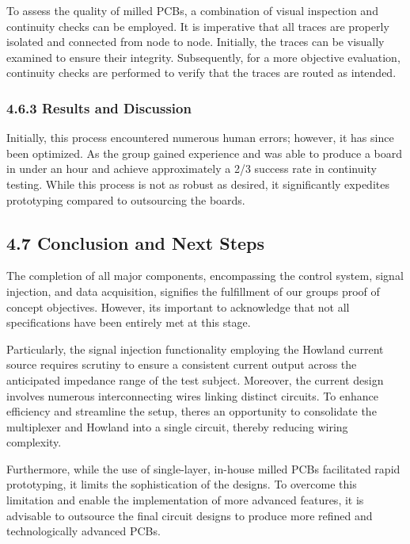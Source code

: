To assess the quality of milled PCBs, a combination of visual inspection
and continuity checks can be employed. It is imperative that all traces
are properly isolated and connected from node to node. Initially, the
traces can be visually examined to ensure their integrity. Subsequently,
for a more objective evaluation, continuity checks are performed to
verify that the traces are routed as intended.

\subsubsection*{\texorpdfstring{\textbf{4.6.3 Results and
Discussion}~}{4.6.3 Results and Discussion~}}\label{results-and-discussion-4}

Initially, this process encountered numerous human errors; however, it
has since been optimized. As the group gained experience and was able to
produce a board in under an hour and achieve approximately a 2/3 success
rate in continuity testing. While this process is not as robust as
desired, it significantly expedites prototyping compared to outsourcing
the boards.

\subsection*{4.7 Conclusion and Next
Steps}\label{conclusion-and-next-steps}

The completion of all major components, encompassing the control system,
signal injection, and data acquisition, signifies the fulfillment of our
group\textquotesingle s proof of concept objectives. However,
it\textquotesingle s important to acknowledge that not all
specifications have been entirely met at this stage.

Particularly, the signal injection functionality employing the Howland
current source requires scrutiny to ensure a consistent current output
across the anticipated impedance range of the test subject. Moreover,
the current design involves numerous interconnecting wires linking
distinct circuits. To enhance efficiency and streamline the setup,
there\textquotesingle s an opportunity to consolidate the multiplexer
and Howland into a single circuit, thereby reducing wiring complexity.

Furthermore, while the use of single-layer, in-house milled PCBs
facilitated rapid prototyping, it limits the sophistication of the
designs. To overcome this limitation and enable the implementation of
more advanced features, it is advisable to outsource the final circuit
designs to produce more refined and technologically advanced PCBs.

